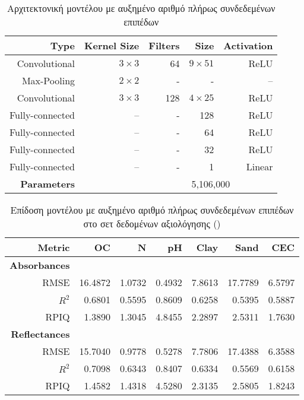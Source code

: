 \begin{table}[H]
    \centering
    \caption{Αρχιτεκτονική μοντέλου με αυξημένο αριθμό πλήρως συνδεδεμένων επιπέδων}
    \begin{tabular}{@{}rrrrr@{}}\toprule
        Type&Kernel Size&Filters&Size&Activation\\
        \midrule
        Convolutional&$3 \times 3$&64&$9 \times 51$&ReLU\\
        Max-Pooling&$2 \times 2$&-&-&–\\
        Convolutional&$3 \times 3$&128&$4 \times 25$&ReLU\\
        Fully-connected&–&-&128&ReLU\\
        Fully-connected&–&-&64&ReLU\\
        Fully-connected&–&-&32&ReLU\\
        Fully-connected&–&-&1&Linear\\
        \hline
        \textbf{Parameters}&&\multicolumn{3}{c}{5,106,000}\\
        \bottomrule
    \end{tabular}
\end{table}
\begin{table}[H]
    \centering
    \caption{Επίδοση μοντέλου με αυξημένο αριθμό πλήρως συνδεδεμένων επιπέδων στο σετ δεδομένων αξιολόγησης ()}
    \begin{tabular}{@{}rrrrrrr@{}}\toprule
        Metric&OC&N&pH&Clay&Sand&CEC\\
        \midrule
        \textbf{Absorbances}&\multicolumn{6}{c}{}\\
        RMSE&16.4872&1.0732&0.4932&7.8613&17.7789&6.5797\\
        $R^2$&0.6801&0.5595&0.8609&0.6258&0.5395&0.5887\\
        RPIQ&1.3890&1.3045&4.8455&2.2897&2.5311&1.7630\\
        \midrule
        \textbf{Reflectances}&\multicolumn{6}{c}{}\\
        RMSE&15.7040&0.9778&0.5278&7.7806&17.4388&6.3588\\
        $R^2$&0.7098&0.6343&0.8407&0.6334&0.5569&0.6158\\
        RPIQ&1.4582&1.4318&4.5280&2.3135&2.5805&1.8243\\
        \bottomrule
    \end{tabular}
\end{table}

